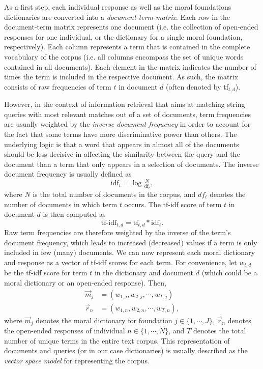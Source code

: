 \documentclass[12pt]{article}
\begin{document}
As a first step, each individual response as well as the moral foundations dictionaries are converted into a \textit{document-term matrix}. Each row in the document-term matrix represents one document (i.e. the collection of open-ended responses for one individual, or the dictionary for a single moral foundation, respectively). Each column represents a term that is contained in the complete vocabulary of the corpus (i.e. all columns encompass the set of unique words contained in all documents). Each element in the matrix indicates the number of times the term is included in the respective document. As such, the matrix consists of raw frequencies of term $t$ in document $d$ (often denoted by tf$_{t,d}$).

However, in the context of information retrieval that aims at matching string queries with most relevant matches out of a set of documents, term frequencies are usually weighted by the \textit{inverse document frequency} in order to account for the fact that some terms have more discriminative power than others. The underlying logic is that a word that appears in almost all of the documents should be less decisive in affecting the similarity between the query and the document than a term that only appears in a selection of documents. The inverse document frequency is usually defined as
\begin{equation}
\text{idf}_t = \log \tfrac{N}{\text{df}_t},
\end{equation}
where $N$ is the total number of documents in the corpus, and $df_t$ denotes the number of documents in which term $t$ occurs. The tf-idf score of term $t$ in document $d$ is then computed as
\begin{equation}
\text{tf-idf}_{t,d} = \text{tf}_{t,d} * \text{idf}_t.
\end{equation}
Raw term frequencies are therefore weighted by the inverse of the term's document frequency, which leads to increased (decreased) values if a term is only included in few (many) documents. We can now represent each moral dictionary and response as a vector of tf-idf scores for each term. For convenience, let $w_{t,d}$ be the tf-idf score for term $t$ in the dictionary and document $d$ (which could be a moral dictionary or an open-ended response). Then,
\begin{align}
\vec{m}_j &= \left(w_{1,j},w_{2,j},\cdots, w_{T,j}\right) \\
\vec{r}_n &= \left(w_{1,n},w_{2,n},\cdots, w_{T,n}\right),
\end{align}
where $\vec{m}_j$ denotes the moral dictionary for foundation $j\in\{1,\cdots,J\}$, $\vec{r}_n$ denotes the open-ended responses of individual $n\in\{1,\cdots,N\}$, and $T$ denotes the total number of unique terms in the entire text corpus. This representation of documents and queries (or in our case dictionaries) is usually described as the \textit{vector space model} for representing the corpus.
\end{document}
